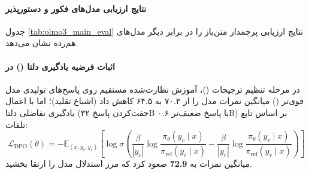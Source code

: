 \paragraph*{نتایج ارزیابی مدل‌های فکور و دستورپذیر}
جدول \ref{tab:olmo3_main_eval} نتایج ارزیابی پرچمدار متن‌باز  را در برابر دیگر مدل‌های هم‌رده نشان می‌دهد.

\begin{table}[htbp]
\centering
\caption{ارزیابی مقایسه‌ای  در برابر مدل‌های ۳۲B متن‌باز}
\label{tab:olmo3_main_eval}
\end{table}

\paragraph*{اثبات فرضیه یادگیری دلتا () در }
در مرحله تنظیم ترجیحات ()، آموزش نظارت‌شده مستقیم روی پاسخ‌های تولیدی مدل قوی‌تر () میانگین نمرات مدل را از ۷۰.۳ به ۶۴.۵ کاهش داد (اشباع تقلید)؛ اما با اعمال یادگیری تفاضلی دلتا (جفت‌کردن پاسخ ۳۲B با پاسخ ضعیف‌تر ۰.۶B) بر اساس تابع تلفات:
\begin{equation}
    \mathcal{L}_{\text{DPO}}(\theta) = -\mathbb{E}_{(x, y_c, y_r)} \left[ \log \sigma \left( \frac{\beta}{|y_c|} \log \frac{\pi_\theta(y_c \mid x)}{\pi_{\text{ref}}(y_c \mid x)} - \frac{\beta}{|y_r|} \log \frac{\pi_\theta(y_r \mid x)}{\pi_{\text{ref}}(y_r \mid x)} \right) \right]
\end{equation}
میانگین نمرات به \textbf{72.9} صعود کرد که مرز استدلال مدل را ارتقا بخشید.


